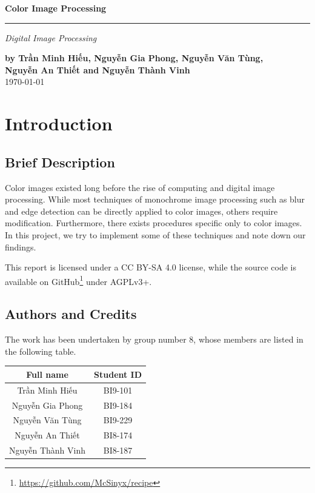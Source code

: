 \documentclass[a4paper,12pt]{article}
\begin{document}
\setcounter{page}{0}
\thispagestyle{empty}
\begin{flushright}
  \setlength{\baselineskip}{1.4\baselineskip}
\textbf{\Huge Color Image Processing}
  \noindent\rule{\textwidth}{5pt}
  \emph{\Large Digital Image Processing}

  \textbf{by Trần Minh Hiếu, Nguyễn Gia Phong, Nguyễn Văn Tùng,\\
          Nguyễn An Thiết and Nguyễn Thành Vinh\\}
  \today
\end{flushright}
\pagebreak

\tableofcontents
\pagebreak

\section{Introduction}
\subsection{Brief Description}
Color images existed long before the rise of computing and digital image
processing.  While most techniques of monochrome image processing such as
blur and edge detection can be directly applied to color images, others
require modification.  Furthermore, there exists procedures specific only
to color images.  In this project, we try to implement some of these
techniques and note down our findings.

This report is licensed under a CC BY-SA 4.0 license, while the source code
is available on GitHub\footnote{\url{https://github.com/McSinyx/recipe}}
under AGPLv3+.

\subsection{Authors and Credits}
The work has been undertaken by group number 8, whose members are listed
in the following table.
\begin{center}
  \begin{tabular}{c c}
    \toprule
    Full name & Student ID\\
    \midrule
    Trần Minh Hiếu & BI9-101\\
    Nguyễn Gia Phong & BI9-184\\
    Nguyễn Văn Tùng & BI9-229\\
    Nguyễn An Thiết & BI8-174\\
    Nguyễn Thành Vinh & BI8-187\\
    \bottomrule
  \end{tabular}
\end{center}
\end{document}
